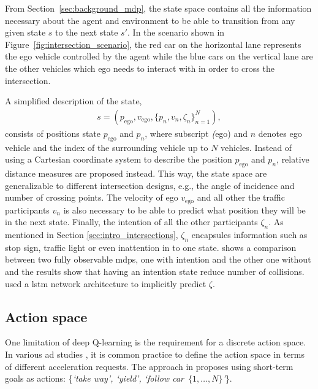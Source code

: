 From Section~\ref{sec:background_mdp}, the state space contains all the information necessary about the agent and environment to be able to transition from any given state $s$ to the next state $s'$. In the scenario shown in Figure~\ref{fig:intersection_scenario}, the red car on the horizontal lane represents the ego vehicle controlled by the agent while the blue cars on the vertical lane are the other vehicles which ego needs to interact with in order to cross the intersection. 

A simplified description of the state, 
\begin{align}
	s = (p_\mathrm{ego}, v_\mathrm{ego}, \{p_{n}, v_n, \zeta_n\}_{n=1}^N), 
	\label{eq:state}
\end{align}
consists of positions state $p_\mathrm{ego}$ and $p_n$, where subscript \textit(ego) and $n$ denotes ego vehicle and the index of the surrounding vehicle up to $N$ vehicles. 
Instead of using a Cartesian coordinate system to describe the position $p_\mathrm{ego}$ and $p_n$, relative distance measures are proposed instead. This way, the state space are generalizable to different intersection designs, e.g., the angle of incidence and number of crossing points. 
The velocity of ego $v_\mathrm{ego}$ and all other the traffic participants $v_n$ is also necessary to be able to predict what position they will be in the next state. Finally, the intention of all the other participants $\zeta_n$. As mentioned in Section \ref{sec:intro_intersections}, $\zeta_n$ encapsules information such as stop sign, traffic light or even inattention in to one state. 
\paperBelief shows a comparison between two fully observable \gls{mdp}s, one with intention and the other one without and the results show that having an intention state reduce number of collisions. 
\paperLSTM used a \gls{lstm} network architecture to implicitly predict $\zeta$. %

\subsection{Action space}
\label{sec:pomdp_actionspace}
One limitation of deep Q-learning is the requirement for a discrete action space. In various \gls{ad} studies \cite{bouton2019}, it is common practice to define the action space in terms of different acceleration requests. The approach in \paperLSTM proposes using short-term goals as actions: \{\textit{`take way', `yield', `follow car~$\{1, \dots , N\}$'}\}.

